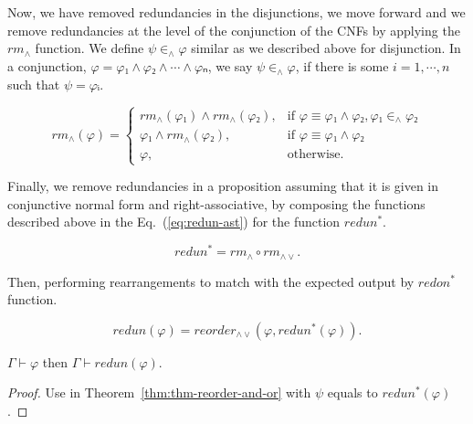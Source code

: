 \documentclass[../main.tex]{subfiles}
\begin{document}
Now, we have removed redundancies in the disjunctions, we move forward and we remove redundancies at the level of the conjunction of the CNFs by applying the $rm_{∧}$ function. We define $ψ ∈_{∧} φ$ similar as we described above for disjunction. In a conjunction, $φ = φ₁ ∧ φ₂ ∧ \cdots ∧ φₙ$, we say
$ψ ∈_{∧} φ$, if there is some $i = 1, \cdots, n$ such that $ψ = φᵢ$.

\begin{equation*}
\label{eq:rm-and}
  rm_{∧}(φ) =
  \begin{cases}
    rm_{∧}(φ₁) ∧ rm_{∧}(φ₂), &\text{if }φ ≡ φ₁ ∧ φ₂, φ₁ ∈_{∧} φ₂\\
    φ₁ ∧ rm_{∧}(φ₂), &\text{if }φ ≡ φ₁ ∧ φ₂\\
    φ,  &\text{otherwise.}
  \end{cases}
\end{equation*}

Finally, we remove redundancies in a proposition assuming that it is given in conjunctive normal form and right-associative, by composing the functions described above in the Eq.~(\ref{eq:redun-ast})
for the function $redun^{*}$.

\begin{equation*}
  \label{eq:redun-ast}
  redun^{*} = rm_{∧} ∘ rm_{∧∨}.
\end{equation*}

Then, performing rearrangements to match with the expected output
by $redon^{*}$ function.

\begin{equation*}
  \label{eq:redun}
  redun(φ) = reorder_{∧∨}(φ, redun^{*}(φ)).
\end{equation*}

\begin{theorem}
  \label{thm:thm_redun}
  $Γ ⊢ φ$ then $Γ ⊢ redun(φ)$.
\end{theorem}

\begin{proof}
Use in Theorem~\ref{thm:thm-reorder-and-or} with $ψ$ equals to
$redun^{*}(φ)$.
\end{proof}

\end{document}
